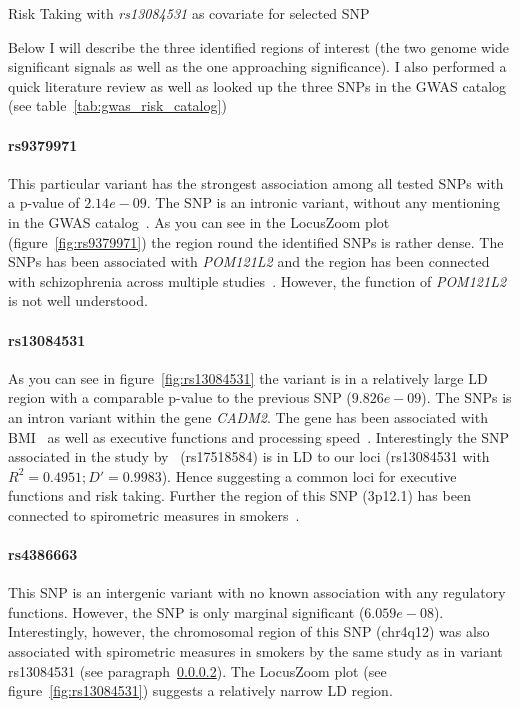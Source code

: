 \begin{table}[!htpb]
	\small
	\centering
	\resizebox{\textwidth}{!}{}
	\caption{Risk Taking with \textit{rs13084531} as covariate for selected SNP}\label{tab:conditional}
\end{table}

Below I will describe the three identified regions of interest (the two genome wide significant signals as well as the one approaching significance).
I also performed a quick literature review as well as looked up the three SNPs in the GWAS catalog (see table~\ref{tab:gwas_risk_catalog})

\paragraph{rs9379971}
\label{par:rs9379971}
This particular variant has the strongest association among all tested SNPs with a p-value of $2.14e-09$. 
The SNP is an intronic variant, without any mentioning in the GWAS catalog~\cite{Welter2014}.
As you can see in the LocusZoom plot (figure~\ref{fig:rs9379971}) the region round the identified SNPs is rather dense. 
The SNPs has been associated with \textit{POM121L2} and the region has been connected with schizophrenia across multiple studies~\cite{Aberg2013,Shi2009}.
However, the function of \textit{POM121L2} is not well understood.

\paragraph{rs13084531}
\label{par:rs13084531}
As you can see in figure~\ref{fig:rs13084531} the variant is in a relatively large LD region with a comparable p-value to the previous SNP ($9.826e-09$).
The SNPs is an intron variant within the gene \textit{CADM2}.
The gene has been associated with BMI~\cite{Speliotes2010} as well as executive functions and processing speed~\cite{Ibrahim-Verbaas2015}.
Interestingly the SNP associated in the study by~\cite{Ibrahim-Verbaas2015} (rs17518584) is in LD to our loci (rs13084531 with $R^2=0.4951;D'=0.9983$).
Hence suggesting a common loci for executive functions and risk taking.
Further the region of this SNP (3p12.1) has been connected to spirometric measures in smokers~\cite{Lutz2015}.

\paragraph{rs4386663}
\label{par:rs4386663}
This SNP is an intergenic variant with no known association with any regulatory functions.
However, the SNP is only marginal significant ($6.059e-08$).
Interestingly, however, the chromosomal region of this SNP (chr4q12) was also associated with spirometric measures in smokers by the same study as in variant rs13084531 (see paragraph~\ref{par:rs13084531}).
The LocusZoom plot (see figure~\ref{fig:rs13084531}) suggests a relatively narrow LD region. 

